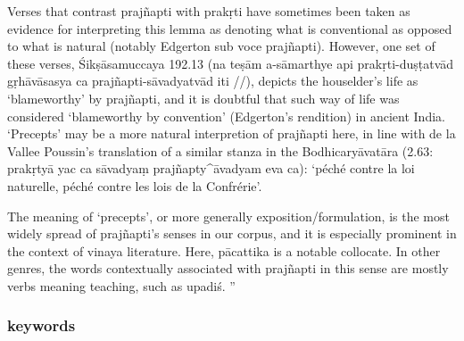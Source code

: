 \documentclass[
  letterpaper,
  DIV=11,
  numbers=noendperiod,
  oneside]{scrreprt}
\begin{document}

Verses that contrast prajñapti with prakṛti have sometimes been taken as
evidence for interpreting this lemma as denoting what is conventional as
opposed to what is natural (notably Edgerton sub voce prajñapti).
However, one set of these verses, Śikṣāsamuccaya 192.13 (na teṣām
a-sāmarthye api prakṛti-duṣṭatvād gṛhāvāsasya ca prajñapti-sāvadyatvād
iti //), depicts the houselder's life as `blameworthy' by prajñapti, and
it is doubtful that such way of life was considered `blameworthy by
convention' (Edgerton's rendition) in ancient India. `Precepts' may be a
more natural interpretion of prajñapti here, in line with de la Vallee
Poussin's translation of a similar stanza in the Bodhicaryāvatāra (2.63:
prakṛtyā yac ca sāvadyaṃ prajñapty\^{}āvadyam eva ca): `péché contre la
loi naturelle, péché contre les lois de la Confrérie'.

The meaning of `precepts', or more generally exposition/formulation, is
the most widely spread of prajñapti's senses in our corpus, and it is
especially prominent in the context of vinaya literature. Here,
pācattika is a notable collocate. In other genres, the words
contextually associated with prajñapti in this sense are mostly verbs
meaning teaching, such as upadiś. ''

\hypertarget{keywords}{%
\subsubsection{keywords}\label{keywords}}

\end{document}
